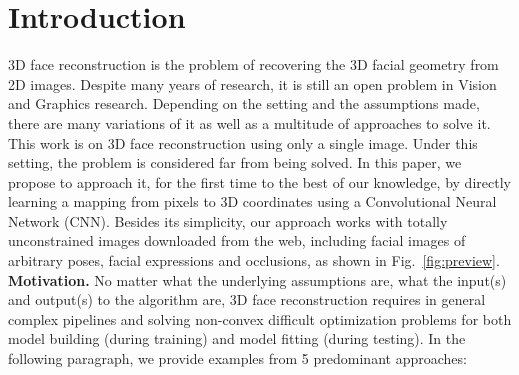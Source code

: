 
\section{Introduction}
3D face reconstruction is the problem of recovering the 3D facial
geometry from 2D images. Despite many years of research, it is still
an open problem in Vision and Graphics research. Depending on the
setting and the assumptions made, there are many variations of it as
well as a multitude of approaches to solve it. This work is on 3D face
reconstruction using only a single image. Under this setting, the
problem is considered far from being solved. In this paper, we propose
to approach it, for the first time to the best of our knowledge, by
directly learning a mapping from pixels to 3D coordinates using a
Convolutional Neural Network (CNN). Besides its simplicity, our
approach works with totally unconstrained images downloaded from the
web, including facial images of arbitrary poses, facial expressions
and occlusions, as shown in Fig.~\ref{fig:preview}. \newline
\textbf{Motivation.} No matter what the underlying assumptions are,
what the input(s) and output(s) to the algorithm are, 3D face
reconstruction requires in general complex pipelines and solving
non-convex difficult optimization problems for both model building
(during training) and model fitting (during testing). In the following
paragraph, we provide examples from 5 predominant approaches:

